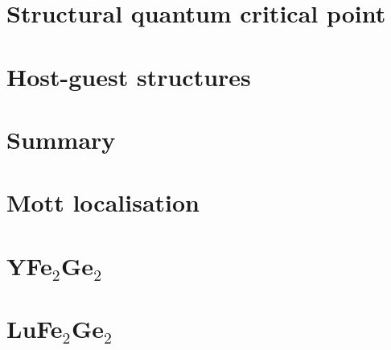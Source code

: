 \section{Structural quantum critical point}


\section{Host-guest structures}





\section{Summary}



\appendix

%
%
%
%
\section{Mott localisation}


\section{YFe$_2$Ge$_2$}


\section{LuFe$_2$Ge$_2$}

% 

% 









%
%

% 









